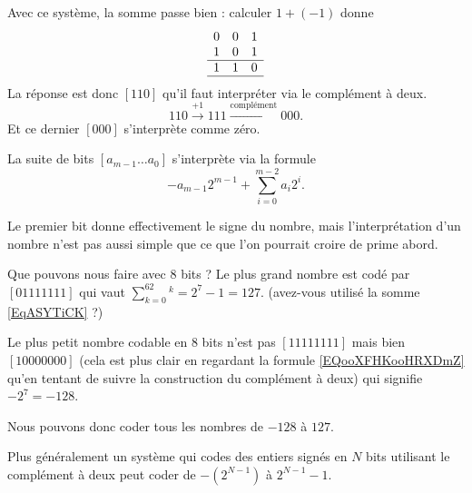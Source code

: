 Avec ce système, la somme passe bien : calculer \( 1+(-1)\) donne
    \begin{equation*}
        \begin{array}[]{ccc}
            0&0&1\\
            1&0&1\\
            \hline
            1&1&0\\
            \hline
        \end{array}
    \end{equation*}
La réponse est donc \( [110]\) qu'il faut interpréter via le complément à deux.
\begin{equation}
    110\stackrel{+1}{\longrightarrow}111\stackrel{\text{complément}}{\longrightarrow}000.
\end{equation}
Et ce dernier \( [000]\) s'interprète comme zéro.

\begin{definition}
    La suite de bits \( [a_{m-1}\ldots a_0]\) s'interprète via la formule
    \begin{equation}        \label{EQooXFHKooHRXDmZ}
        -a_{m-1}2^{m-1}+\sum_{i=0}^{m-2}a_i2^i.
    \end{equation}
\end{definition}

Le premier bit donne effectivement le signe du nombre, mais l'interprétation d'un nombre n'est pas aussi simple que ce que l'on pourrait croire de prime abord.

\begin{example}
    Que pouvons nous faire avec \( 8\) bits ? Le plus grand nombre est codé par \( [01111111]\) qui vaut \( \sum_{k=0}^62^k=2^7-1=127\). (avez-vous utilisé la somme \eqref{EqASYTiCK} ?)

    Le plus petit nombre codable en \( 8\) bits n'est pas \( [11111111]\) mais bien \( [10000000]\) (cela est plus clair en regardant la formule \eqref{EQooXFHKooHRXDmZ} qu'en tentant de suivre la construction du complément à deux) qui signifie \( -2^7=-128\).

    Nous pouvons donc coder tous les nombres de \( -128\) à \( 127\).
\end{example}

Plus généralement un système qui codes des entiers signés en \( N\) bits utilisant le complément à deux peut coder de \( -(2^{N-1})\) à \( 2^{N-1}-1\).

